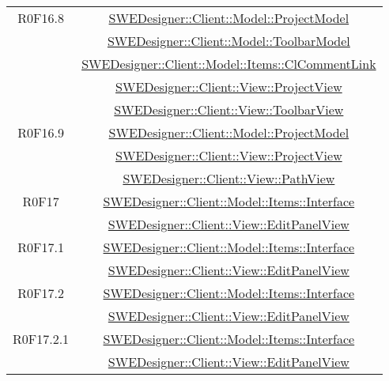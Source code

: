 \documentclass[../DefinizioneDiProdotto.tex]{subfiles}
\begin{document}
\begin{longtable}{|c|c|}
				R0F16.8
				& \hyperlink{SWEDesigner::Client::Model::ProjectModel}{SWEDesigner::Client::Model::ProjectModel}\\
				& \hyperlink{SWEDesigner::Client::Model::ToolbarModel}{SWEDesigner::Client::Model::ToolbarModel}\\
				& \hyperlink{SWEDesigner::Client::Model::Items::ClCommentLink}{SWEDesigner::Client::Model::Items::ClCommentLink}\\
				& \hyperlink{SWEDesigner::Client::View::ProjectView}{SWEDesigner::Client::View::ProjectView}\\
				& \hyperlink{SWEDesigner::Client::View::ToolbarView}{SWEDesigner::Client::View::ToolbarView}\\
				\hline

				R0F16.9
				& \hyperlink{SWEDesigner::Client::Model::ProjectModel}{SWEDesigner::Client::Model::ProjectModel}\\
				& \hyperlink{SWEDesigner::Client::View::ProjectView}{SWEDesigner::Client::View::ProjectView}\\
				& \hyperlink{SWEDesigner::Client::View::PathView}{SWEDesigner::Client::View::PathView}\\
				\hline

				R0F17
				& \hyperlink{SWEDesigner::Client::Model::Items::Interface}{SWEDesigner::Client::Model::Items::Interface}\\
				& \hyperlink{SWEDesigner::Client::View::EditPanelView}{SWEDesigner::Client::View::EditPanelView}\\
				\hline

				R0F17.1
				& \hyperlink{SWEDesigner::Client::Model::Items::Interface}{SWEDesigner::Client::Model::Items::Interface}\\
				& \hyperlink{SWEDesigner::Client::View::EditPanelView}{SWEDesigner::Client::View::EditPanelView}\\
				\hline

				R0F17.2
				& \hyperlink{SWEDesigner::Client::Model::Items::Interface}{SWEDesigner::Client::Model::Items::Interface}\\
				& \hyperlink{SWEDesigner::Client::View::EditPanelView}{SWEDesigner::Client::View::EditPanelView}\\
				\hline

				R0F17.2.1
				& \hyperlink{SWEDesigner::Client::Model::Items::Interface}{SWEDesigner::Client::Model::Items::Interface}\\
				& \hyperlink{SWEDesigner::Client::View::EditPanelView}{SWEDesigner::Client::View::EditPanelView}\\
				\hline


\end{longtable}
\end{document}
